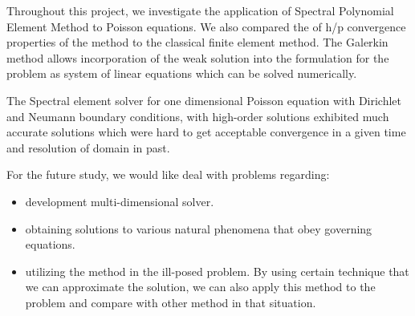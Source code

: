 
Throughout this project, we investigate the application of
Spectral Polynomial Element Method to Poisson equations. We also
compared the  of h/p convergence properties of the method to the
classical finite element method. The Galerkin method allows
incorporation of the weak solution into the formulation for the
problem as system of linear equations which can be solved
numerically.

The Spectral element solver for one dimensional Poisson equation
with Dirichlet and Neumann boundary conditions, with high-order
solutions exhibited much accurate solutions which were hard to get
acceptable convergence in a given time and resolution of domain in
past.

For the future study, we would like deal with problems regarding:

\begin{itemize}
\item
development multi-dimensional solver.
\item
obtaining solutions to various natural phenomena that obey
governing equations.
\item
utilizing the method in the ill-posed problem. By using certain
technique that we can approximate the solution, we can also apply
this method to the problem and compare with other method in that
situation.
\end{itemize}
